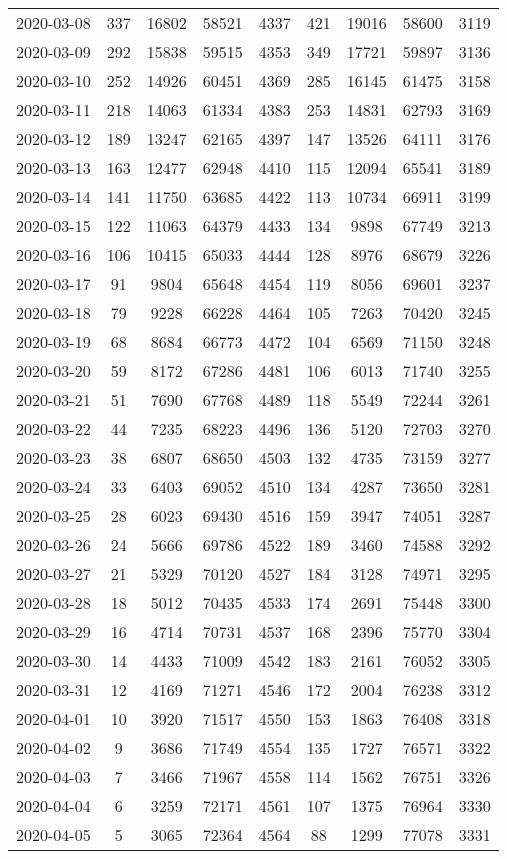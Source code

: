 \begin{longtable}{ccccccccc}
2020-03-08&337&16802&58521&4337&421&19016&58600&3119\\
2020-03-09&292&15838&59515&4353&349&17721&59897&3136\\
2020-03-10&252&14926&60451&4369&285&16145&61475&3158\\
2020-03-11&218&14063&61334&4383&253&14831&62793&3169\\
2020-03-12&189&13247&62165&4397&147&13526&64111&3176\\
2020-03-13&163&12477&62948&4410&115&12094&65541&3189\\
2020-03-14&141&11750&63685&4422&113&10734&66911&3199\\
2020-03-15&122&11063&64379&4433&134&9898&67749&3213\\
2020-03-16&106&10415&65033&4444&128&8976&68679&3226\\
2020-03-17&91&9804&65648&4454&119&8056&69601&3237\\
2020-03-18&79&9228&66228&4464&105&7263&70420&3245\\
2020-03-19&68&8684&66773&4472&104&6569&71150&3248\\
2020-03-20&59&8172&67286&4481&106&6013&71740&3255\\
2020-03-21&51&7690&67768&4489&118&5549&72244&3261\\
2020-03-22&44&7235&68223&4496&136&5120&72703&3270\\
2020-03-23&38&6807&68650&4503&132&4735&73159&3277\\
2020-03-24&33&6403&69052&4510&134&4287&73650&3281\\
2020-03-25&28&6023&69430&4516&159&3947&74051&3287\\
2020-03-26&24&5666&69786&4522&189&3460&74588&3292\\
2020-03-27&21&5329&70120&4527&184&3128&74971&3295\\
2020-03-28&18&5012&70435&4533&174&2691&75448&3300\\
2020-03-29&16&4714&70731&4537&168&2396&75770&3304\\
2020-03-30&14&4433&71009&4542&183&2161&76052&3305\\
2020-03-31&12&4169&71271&4546&172&2004&76238&3312\\
2020-04-01&10&3920&71517&4550&153&1863&76408&3318\\
2020-04-02&9&3686&71749&4554&135&1727&76571&3322\\
2020-04-03&7&3466&71967&4558&114&1562&76751&3326\\
2020-04-04&6&3259&72171&4561&107&1375&76964&3330\\
2020-04-05&5&3065&72364&4564&88&1299&77078&3331\\

\end{longtable}
